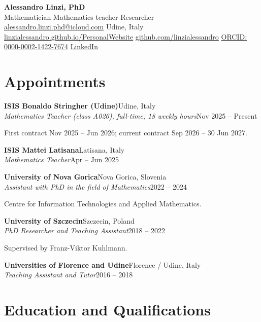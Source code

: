 \documentclass[10pt,a4paper]{article}
\newcommand{\entry}[4]{%
  \textbf{#1}\hfill #2\\
  \textit{#3}\hfill #4\par\vspace{0.6em}}
\begin{document}
{\LARGE\bfseries Alessandro Linzi, PhD}\\[0.3em]
Mathematician \textperiodcentered{} Mathematics teacher \textperiodcentered{} Researcher\\[0.3em]
\href{mailto:alessandro.linzi.phd@icloud.com}{alessandro.linzi.phd@icloud.com} \textperiodcentered{} Udine, Italy\\
\href{https://linzialessandro.github.io/PersonalWebsite/}{linzialessandro.github.io/PersonalWebsite} \textperiodcentered{}
\href{https://github.com/linzialessandro}{github.com/linzialessandro} \textperiodcentered{}
\href{https://orcid.org/0000-0002-1422-7674}{ORCID: 0000-0002-1422-7674} \textperiodcentered{}
\href{https://www.linkedin.com/in/alessandro-linzi-65bb41354/}{LinkedIn}

\section*{Appointments}

\entry{ISIS Bonaldo Stringher (Udine)}{Udine, Italy}
  {Mathematics Teacher (class A026), full-time, 18 weekly hours}{Nov 2025 -- Present}
\vspace{-0.4em}
First contract Nov 2025 -- Jun 2026; current contract Sep 2026 -- 30 Jun 2027.\par\vspace{0.6em}

\entry{ISIS Mattei Latisana}{Latisana, Italy}
  {Mathematics Teacher}{Apr -- Jun 2025}

\entry{University of Nova Gorica}{Nova Gorica, Slovenia}
  {Assistant with PhD in the field of Mathematics}{2022 -- 2024}
\vspace{-0.4em}
Centre for Information Technologies and Applied Mathematics.\par\vspace{0.6em}

\entry{University of Szczecin}{Szczecin, Poland}
  {PhD Researcher and Teaching Assistant}{2018 -- 2022}
\vspace{-0.4em}
Supervised by Franz-Viktor Kuhlmann.\par\vspace{0.6em}

\entry{Universities of Florence and Udine}{Florence / Udine, Italy}
  {Teaching Assistant and Tutor}{2016 -- 2018}

\section*{Education and Qualifications}
\end{document}
